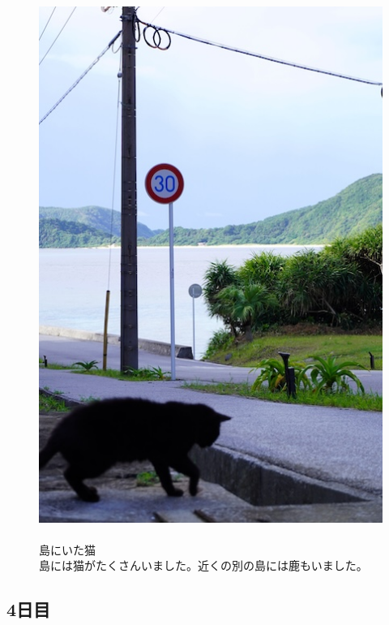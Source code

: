 \documentclass[../main]{subfiles}
\begin{document}
\begin{figure}[H]
  \begin{minipage}[b]{0.48\columnwidth}
    \centering
    \includegraphics[width=0.9\columnwidth]{figure/zamami_neko.jpg}
  \end{minipage}
  \hspace{0.04\columnwidth} %
  \begin{minipage}[b]{0.48\columnwidth}
    \caption{\\
    島にいた猫\\
    島には猫がたくさんいました。近くの別の島には鹿もいました。
    }
  \end{minipage}
\end{figure}

\subsection{4日目}
\end{document}
